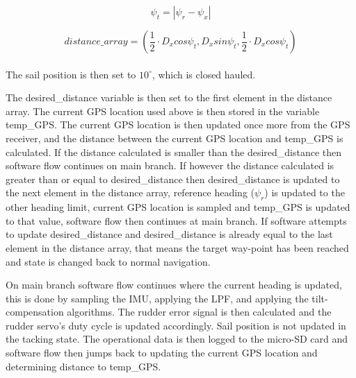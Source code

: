 \begin{equation}
    \label{eq:tacking-angle}
    \psi_{t} = |\psi_{r} - \psi_{x}|
\end{equation}

\begin{equation}
    \label{eq:distance-array}
    distance\_array = \left( \frac{1}{2} \cdot D_xcos\psi_t ,  D_xsin\psi_t,  \frac{1}{2} \cdot D_xcos\psi_t  \right)
\end{equation}
\\
The sail position is then set to $10^{\circ}$, which is closed hauled.


The desired\_distance variable is then set to the first element in the distance array. The current GPS location used above is then stored in the variable temp\_GPS. The current GPS location is then 
updated once more from the GPS receiver, and the distance between the current GPS location and temp\_GPS is calculated. If the distance calculated is smaller than the desired\_distance then software 
flow continues on main branch. If however the distance calculated is greater than or equal to desired\_distance then desired\_distance is updated to the next element in the distance array, 
reference heading ($\psi_r$) is updated to the other heading limit, current GPS location is sampled and temp\_GPS is updated to that value, software flow then continues at main branch. If 
software attempts to update desired\_distance and desired\_distance is already equal to the last element in the distance array, that means the target way-point has been reached and state is 
changed back to normal navigation.


On main branch software flow continues where the current heading is updated, this is done by sampling the IMU, applying the LPF, and applying the tilt-compensation algorithms. The rudder error signal is
then calculated and the rudder servo's duty cycle is updated accordingly. Sail position is not updated in the tacking state. The operational data is then logged to the micro-SD card and software 
flow then jumps back to updating the current GPS location and determining distance to temp\_GPS.





